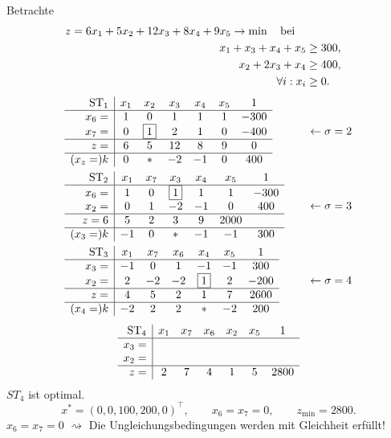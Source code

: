 \begin{exmp}
  Betrachte
  \[ \begin{aligned}
      z = 6 x_1 + 5 x_2 + 12 x_3 + 8 x_4 + 9 x_5 \to \min \quad \text{bei} \quad \\
      x_1 + x_3 + x_4 + x_5 &\ge 300, \\
      x_2 + 2 x_3 + x_4 &\ge 400, \\
      \forall i : x_i &\ge 0.
  \end{aligned}
\]
\begin{align*}
    &\begin{array}{r|cccccc}
      \operatorname*{ST}_1 & x_1 & x_2 & x_3 & x_4 & x_5 & 1 \\
      \hline
      x_6 = & 1 & 0 & 1 & 1 & 1 & -300 \\
      x_7 = & 0 & \boxed{1} & 2 & 1 & 0 & -400 \\
      \hline
      z =   & 6 & 5 & 12 & 8 & 9 & 0 \\
      \hline
      (x_z =) k & 0 & \ast & -2 & -1 & 0 & 400 
    \end{array}
    &\quad &\leftarrow \sigma = 2 \\
    &\begin{array}{r|cccccc}
      \operatorname*{ST}_2 & x_1 & x_7 & x_3 & x_4 & x_5 & 1 \\
      \hline
      x_6 = & 1 & 0 & \boxed{1} & 1 & 1 & -300 \\
      x_2 = & 0 & 1 & -2 & -1 & 0 & 400 \\
      \hline
      z = 6 & 5 & 2 & 3 & 9 & 2000 \\
      \hline
      (x_3 = ) k & -1 & 0 & \ast & -1 & -1 & 300
    \end{array}
    &\quad &\leftarrow \sigma = 3 \\
    &\begin{array}{r|cccccc}
       \operatorname*{ST}_3 & x_1 & x_7 & x_6 & x_4 & x_5 & 1 \\
       \hline
       x_3 = & -1 & 0 & 1 & -1 & -1 & 300 \\
       x_2 = & 2 & -2 & -2 & \boxed{1} & 2 & -200 \\
       \hline
       z = & 4 & 5 & 2 & 1 & 7 & 2600 \\
       \hline
      (x_4 = ) k & -2 & 2 & 2 & \ast & -2 & 200 \\
    \end{array}
    &\quad &\leftarrow \sigma = 4
\end{align*}
\[ \begin{array}{r|cccccc}
      \operatorname*{ST}_4 & x_1 & x_7 & x_6 & x_2 & x_5 & 1 \\
      \hline
      x_3 = \\
      x_2 = \\
      \hline
      z = & 2 & 7 & 4 & 1 & 5 & 2800
    \end{array}
\]
$ST_4$ ist optimal.
\[ x^* = (0, 0, 100, 200, 0)^\top,  \qquad x_6 = x_7 = 0, \qquad z_{\min} =
  2800. \]
$x_6 = x_7 = 0$ $\rightsquigarrow$ Die Ungleichungsbedingungen werden mit
Gleichheit erfüllt!
\end{exmp}

